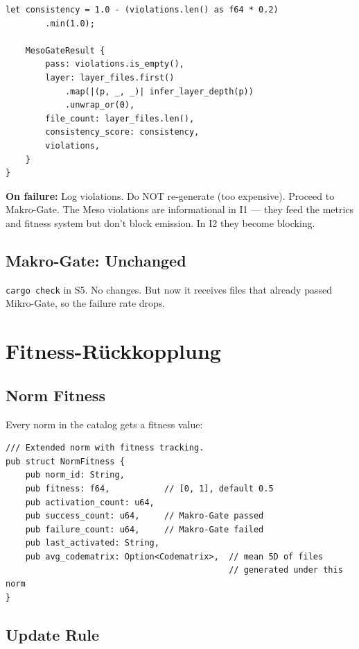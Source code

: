 \documentclass[11pt,a4paper]{article}
\begin{document}
\begin{lstlisting}[style=rust]
    let consistency = 1.0 - (violations.len() as f64 * 0.2)
        .min(1.0);
    
    MesoGateResult {
        pass: violations.is_empty(),
        layer: layer_files.first()
            .map(|(p, _, _)| infer_layer_depth(p))
            .unwrap_or(0),
        file_count: layer_files.len(),
        consistency_score: consistency,
        violations,
    }
}
\end{lstlisting}

\textbf{On failure:} Log violations. Do NOT re-generate 
(too expensive). Proceed to Makro-Gate. The Meso violations 
are informational in I1 --- they feed the metrics and fitness 
system but don't block emission. In I2 they become blocking.

\subsection{Makro-Gate: Unchanged}

\texttt{cargo check} in S5. No changes. But now it receives 
files that already passed Mikro-Gate, so the failure rate drops.


\section{Fitness-R\"uckkopplung}
\label{sec:fitness}

\subsection{Norm Fitness}

Every norm in the catalog gets a fitness value:

\begin{lstlisting}[style=rust]
/// Extended norm with fitness tracking.
pub struct NormFitness {
    pub norm_id: String,
    pub fitness: f64,           // [0, 1], default 0.5
    pub activation_count: u64,
    pub success_count: u64,     // Makro-Gate passed
    pub failure_count: u64,     // Makro-Gate failed
    pub last_activated: String,
    pub avg_codematrix: Option<Codematrix>,  // mean 5D of files
                                             // generated under this norm
}
\end{lstlisting}

\subsection{Update Rule}
\end{document}
